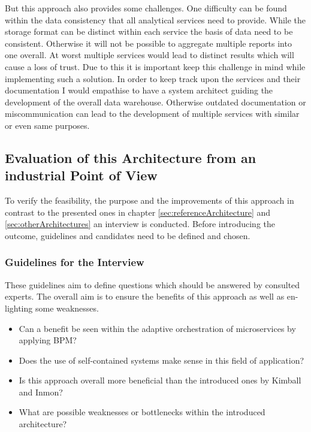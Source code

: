But this approach also provides some challenges. One difficulty can be found within the data consistency that all analytical services need to provide. While the storage format can be distinct within each service the basis of data need to be consistent. Otherwise it will not be possible to aggregate multiple reports into one overall. At worst multiple services would lead to distinct results which will cause a loss of trust. Due to this it is important keep this challenge in mind while implementing such a solution. \newline
In order to keep track upon the services and their documentation I would empathise to have a system architect guiding the development of the overall data warehouse. Otherwise outdated documentation or miscommunication can lead to the development of multiple services with similar or even same purposes. 

\subsection{Evaluation of this Architecture from an industrial Point of View}
To verify the feasibility, the purpose and the improvements of this approach in contrast to the presented ones in chapter \ref{sec:referenceArchitecture} and \ref{sec:otherArchitectures} an interview is conducted. Before introducing the outcome, guidelines and candidates need to be defined and chosen.

\subsubsection{Guidelines for the Interview}
These guidelines aim to define questions which should be answered by consulted experts. The overall aim is to ensure the benefits of this approach as well as en-lighting some weaknesses. 
\begin{itemize}
    \item Can a benefit be seen within the adaptive orchestration of microservices by applying BPM?
    \item Does the use of self-contained systems make sense in this field of application?
    \item Is this approach overall more beneficial than the introduced ones by Kimball and Inmon?
    \item What are possible weaknesses or bottlenecks within the introduced architecture?
\end{itemize}

